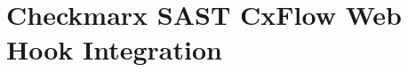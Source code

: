 \chapter{Checkmarx SAST CxFlow Web Hook Integration}\label{chap:build_env_affinity}


















